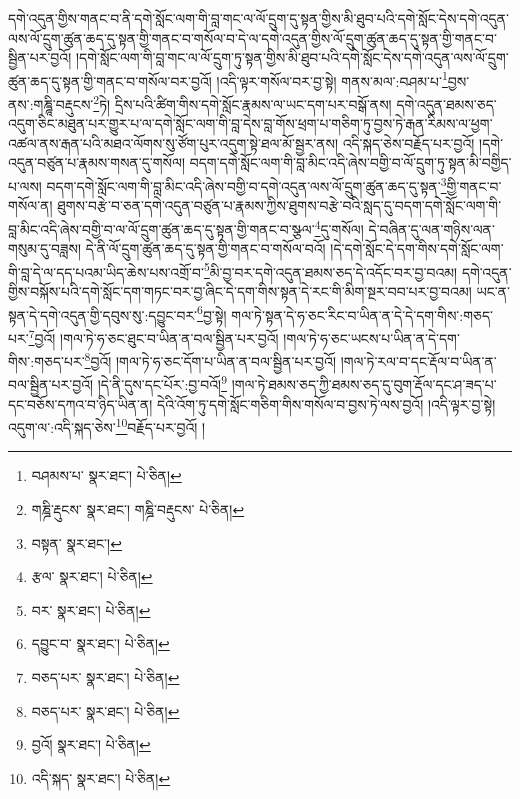 དགེ་འདུན་གྱིས་གནང་བ་ནི་དགེ་སློང་ལག་གི་བླ་གང་ལ་ལོ་དྲུག་དུ་སྟན་གྱིས་མི་ཐུབ་པའི་དགེ་སློང་དེས་དགེ་འདུན་ལས་ལོ་དྲུག་ཚུན་ཆད་དུ་སྟན་གྱི་གནང་བ་གསོལ་བ་དེ་ལ་དགེ་འདུན་གྱིས་ལོ་དྲུག་ཚུན་ཆད་དུ་སྟན་གྱི་གནང་བ་སྦྱིན་པར་བྱའོ། །དགེ་སློང་ལག་གི་བླ་གང་ལ་ལོ་དྲུག་ཏུ་སྟན་གྱིས་མི་ཐུབ་པའི་དགེ་སློང་དེས་དགེ་འདུན་ལས་ལོ་དྲུག་ཚུན་ཆད་དུ་སྟན་གྱི་གནང་བ་གསོལ་བར་བྱའོ། །འདི་ལྟར་གསོལ་བར་བྱ་སྟེ། གནས་མལ་:བཤམ་པ་\footnote{བཤམས་པ་  སྣར་ཐང་།  པེ་ཅིན། }བྱས་ནས་:གཎྜཱི་བརྡུངས་\footnote{གཎྜི་རྡུངས་  སྣར་ཐང་། གཎྜི་བརྡུངས་  པེ་ཅིན། }ཏེ། དྲིས་པའི་ཚིག་གིས་དགེ་སློང་རྣམས་ལ་ཡང་དག་པར་བསྒོ་ནས། དགེ་འདུན་ཐམས་ཅད་འདུག་ཅིང་མཐུན་པར་གྱུར་པ་ལ་དགེ་སློང་ལག་གི་བླ་དེས་བླ་གོས་ཕྲག་པ་གཅིག་ཏུ་བྱས་ཏེ་རྒན་རིམས་ལ་ཕྱག་འཚལ་ནས་རྒན་པའི་མཐའ་ལོགས་སུ་ཙོག་པུར་འདུག་སྟེ་ཐལ་མོ་སྦྱར་ནས། འདི་སྐད་ཅེས་བརྗོད་པར་བྱའོ། །དགེ་འདུན་བཙུན་པ་རྣམས་གསན་དུ་གསོལ། བདག་དགེ་སློང་ལག་གི་བླ་མིང་འདི་ཞེས་བགྱི་བ་ལོ་དྲུག་ཏུ་སྟན་མི་བགྱིད་པ་ལས། བདག་དགེ་སློང་ལག་གི་བླ་མིང་འདི་ཞེས་བགྱི་བ་དགེ་འདུན་ལས་ལོ་དྲུག་ཚུན་ཆད་དུ་སྟན་\footnote{བསྟན་  སྣར་ཐང་། }གྱི་གནང་བ་གསོལ་ན། ཐུགས་བརྩེ་བ་ཅན་དགེ་འདུན་བཙུན་པ་རྣམས་ཀྱིས་ཐུགས་བརྩེ་བའི་སླད་དུ་བདག་དགེ་སློང་ལག་གི་བླ་མིང་འདི་ཞེས་བགྱི་བ་ལ་ལོ་དྲུག་ཚུན་ཆད་དུ་སྟན་གྱི་གནང་བ་སྩལ་\footnote{རྩལ་  སྣར་ཐང་།  པེ་ཅིན། }དུ་གསོལ། དེ་བཞིན་དུ་ལན་གཉིས་ལན་གསུམ་དུ་བཟླས། དེ་ནི་ལོ་དྲུག་ཚུན་ཆད་དུ་སྟན་གྱི་གནང་བ་གསོལ་བའོ། །དེ་དགེ་སློང་དེ་དག་གིས་དགེ་སློང་ལག་གི་བླ་དེ་ལ་དད་པའམ་ཡིད་ཆེས་པས་འགྲོ་བ་\footnote{བར་  སྣར་ཐང་།  པེ་ཅིན། }མི་བྱ་བར་དགེ་འདུན་ཐམས་ཅད་དེ་འདོང་བར་བྱ་བའམ། དགེ་འདུན་གྱིས་བསྐོས་པའི་དགེ་སློང་དག་གཏང་བར་བྱ་ཞིང་དེ་དག་གིས་སྟན་དེ་རང་གི་མིག་སྔར་བབ་པར་བྱ་བའམ། ཡང་ན་སྟན་དེ་དགེ་འདུན་གྱི་དབུས་སུ་:དབྱུང་བར་\footnote{དབྱུང་བ་  སྣར་ཐང་།  པེ་ཅིན། }བྱ་སྟེ། གལ་ཏེ་སྟན་དེ་ཧ་ཅང་རིང་བ་ཡིན་ན་དེ་དེ་དག་གིས་:གཅད་པར་\footnote{བཅད་པར་  སྣར་ཐང་།  པེ་ཅིན། }བྱའོ། །གལ་ཏེ་ཧ་ཅང་ཐུང་བ་ཡིན་ན་བལ་སྦྱིན་པར་བྱའོ། །གལ་ཏེ་ཧ་ཅང་ཡངས་པ་ཡིན་ན་དེ་དག་གིས་:གཅད་པར་\footnote{བཅད་པར་  སྣར་ཐང་།  པེ་ཅིན། }བྱའོ། །གལ་ཏེ་ཧ་ཅང་དོག་པ་ཡིན་ན་བལ་སྦྱིན་པར་བྱའོ། །གལ་ཏེ་རལ་བ་དང་རྡོལ་བ་ཡིན་ན་བལ་སྦྱིན་པར་བྱའོ། །དེ་ནི་དུས་དང་པོར་:བྱ་བའོ།\footnote{བྱའོ།  སྣར་ཐང་།  པེ་ཅིན། } །གལ་ཏེ་ཐམས་ཅད་ཀྱི་ཐམས་ཅད་དུ་བུག་རྡོལ་དང་ཤ་ཟད་པ་དང་བཅོས་དཀའ་བ་ཉིད་ཡིན་ན། དེའི་འོག་ཏུ་དགེ་སློང་གཅིག་གིས་གསོལ་བ་བྱས་ཏེ་ལས་བྱའོ། །འདི་ལྟར་བྱ་སྟེ། འདུག་ལ་:འདི་སྐད་ཅེས་\footnote{འདི་སྐད་  སྣར་ཐང་།  པེ་ཅིན། }བརྗོད་པར་བྱའོ། །
